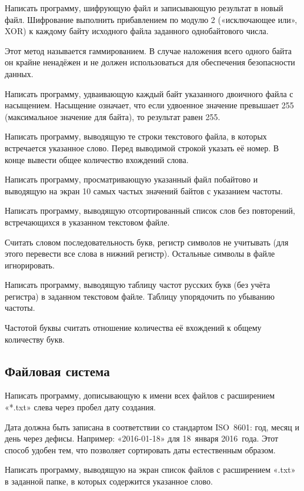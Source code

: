 \task Написать программу, шифрующую файл и записывающую результат в
новый файл. Шифрование выполнить прибавлением по модулю 2
(«исключающее или», XOR) к каждому байту исходного файла заданного
однобайтового числа.

Этот метод называется гаммированием. В случае
наложения всего одного байта он крайне ненадёжен и не должен
использоваться для обеспечения безопасности данных.

\task Написать программу, удваивающую каждый байт указанного двоичного
файла с насыщением. Насыщение означает, что если
удвоенное значение превышает 255 (максимальное значение для байта), то
результат равен 255.

\task Написать программу, выводящую те строки текстового файла, в
которых встречается указанное слово. Перед выводимой строкой указать
её номер. В конце вывести общее количество вхождений слова.

\task Написать программу, просматривающую указанный файл побайтово и
выводящую на экран 10 самых частых значений байтов с указанием
частоты.

\task Написать программу, выводящую отсортированный список слов без
повторений, встречающихся в указанном текстовом файле.

Считать словом последовательность букв, регистр символов не учитывать
(для этого перевести все слова в нижний регистр). Остальные символы в
файле игнорировать.

\task Написать программу, выводящую таблицу частот русских букв (без
учёта регистра) в заданном текстовом файле. Таблицу упорядочить по
убыванию частоты.

Частотой буквы считать отношение количества её вхождений к общему
количеству букв.


\subsection{Файловая система}

\task Написать программу, дописывающую к имени всех файлов с
расширением «*.txt» слева через пробел дату создания.

Дата должна быть записана в соответствии со стандартом
ISO~8601: год, месяц и день через
дефисы. Например: «2016-01-18» для 18~января 2016~года. Этот способ
удобен тем, что позволяет сортировать даты естественным образом.

\task Написать программу, выводящую на экран список файлов с
расширением «.txt» в заданной папке, в которых содержится указанное
слово.

